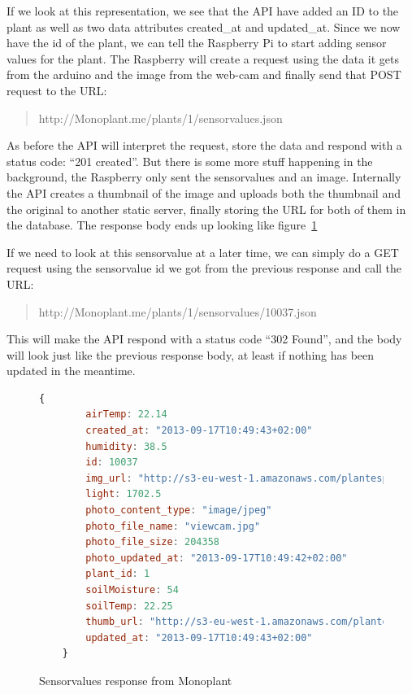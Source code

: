 If we look at this representation, we see that the API have added an ID to the plant as well as two data attributes created\_at and updated\_at. Since we now have the id of the plant, we can tell the Raspberry Pi to start adding sensor values for the plant. The Raspberry will create a request using the data it gets from the arduino and the image from the web-cam and finally send that POST request to the URL:

\begin{quote}
http://Monoplant.me/plants/1/sensorvalues.json 
\end{quote}

As before the API will interpret the request, store the data and respond with a status code: “201 created”. But there is some more stuff happening in the background, the Raspberry only sent the sensorvalues and an image. Internally the API creates a thumbnail of the image and uploads both the thumbnail and the original to another static server, finally storing the URL for both of them in the database. The response body ends up looking like figure~\ref{fig:sensorvaluesresponse}

If we need to look at this sensorvalue at a later time, we can simply do a GET request using the sensorvalue id we got from the previous response and call the URL:

\begin{quote}
http://Monoplant.me/plants/1/sensorvalues/10037.json 
\end{quote}

This will make the API respond with a status code “302 Found”, and the body will look just like the previous response body, at least if nothing has been updated in the meantime. 

\begin{figure}
    \begin{lstlisting}[language=javascript]
    {
        airTemp: 22.14
        created_at: "2013-09-17T10:49:43+02:00"
        humidity: 38.5
        id: 10037
        img_url: "http://s3-eu-west-1.amazonaws.com/plantespann/2013/9/17/original/10037.jpg?1379407782"
        light: 1702.5
        photo_content_type: "image/jpeg"
        photo_file_name: "viewcam.jpg"
        photo_file_size: 204358
        photo_updated_at: "2013-09-17T10:49:42+02:00"
        plant_id: 1
        soilMoisture: 54
        soilTemp: 22.25
        thumb_url: "http://s3-eu-west-1.amazonaws.com/plantespann/2013/9/17/thumb/10037.jpg?1379407782"
        updated_at: "2013-09-17T10:49:43+02:00"
    }
    \end{lstlisting}
    \caption{Sensorvalues response from Monoplant}
    \label{fig:sensorvaluesresponse}
\end{figure}

